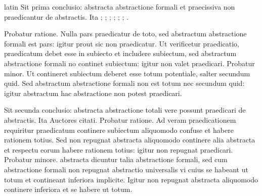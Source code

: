 \begin{otherlanguage*}{latin}
\pstart
  Sit prima conclusio: abstracta abstractione formali et praecissiva non praedicantur de abstractis. Ita  ; ; ; ; ; ; . 
\pend

\pstart
  Probatur ratione. Nulla pars praedicatur de toto, sed abstractum abstractione formali est pars: igitur prout sic non praedicatur. Ut verificetur praedicatio, praedicatum debet esse in subiecto et includere subiectum, sed abstractum abstractione formali no continet subiectum: igitur non valet praedicari. Probatur minor. Ut contineret subiectum deberet esse totum potentiale, salter secundum quid. Sed abstractum abstractione formali non est totum nec secundum quid: igitur abstractum hac abstractione non potest praedicari. 
\pend

\pstart
  Sit secunda conclusio: abstracta abstractione totali vere possunt praedicari de abstractis. Ita Auctores citati. Probatur ratione. Ad veram praedicationem requiritur praedicatum continere subiectum aliquomodo confuse et habere rationem totius. Sed non repugnat abstracta aliquomodo continere alia abstracta et respectu eorum habere rationem totius: igitur non repugnat praedicari. Probatur minore.  abstracta dicuntur talia abstractione formali, sed cum abstractione formali non repugnat abstractio  universalis vi cuius se habeant ut totum et contineant inferiora implicite. Igitur non repugnat abstracta aliquomodo continere inferiora et se habere ut totum. 
\pend


\end{otherlanguage*}
